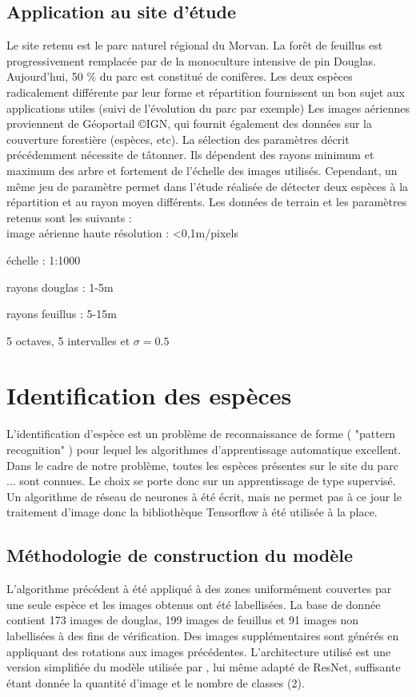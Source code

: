 \documentclass{article}
\begin{document}
	\subsection{Application au site d'étude}
	Le site retenu est le parc naturel régional du Morvan. La forêt de feuillus est progressivement remplacée par de la monoculture intensive de pin Douglas. Aujourd'hui, 50 \% du parc est constitué de conifères. Les deux espèces radicalement différente par leur forme et répartition fournissent un bon sujet aux applications utiles (suivi de l'évolution du parc par exemple) 
	Les images aériennes proviennent de Géoportail \copyright IGN, qui fournit également des données sur la couverture forestière (espèces, etc).
	La sélection des paramètres décrit précédemment nécessite de tâtonner. Ils dépendent des rayons minimum et maximum des arbre et fortement de l'échelle des images utilisés. Cependant, un même jeu de paramètre permet dans l'étude réalisée de détecter deux espèces à la répartition et au rayon moyen différents.  
	Les données de terrain et les paramètres retenus sont les suivants :\\
	
	image aérienne haute résolution : <0,1m/pixels

	échelle : 1:1000
	
	rayons douglas : 1-5m
	
	rayons feuillus : 5-15m

	5 octaves, 5 intervalles et $\sigma=0.5$
	
\section{Identification des espèces}

	L'identification d'espèce est un problème de reconnaissance de forme ( "pattern recognition" ) pour lequel les algorithmes d'apprentissage automatique excellent. 
	Dans le cadre de notre problème, toutes les espèces présentes sur le site du parc ... sont connues. Le choix se porte donc sur un apprentissage de type supervisé.
	Un algorithme de réseau de neurones à été écrit, mais ne permet pas à ce jour le traitement d'image donc la bibliothèque Tensorflow à été utilisée à la place.

	\subsection{Méthodologie de construction du modèle}

		L'algorithme précédent à été appliqué à des zones uniformément couvertes par une seule espèce et les images obtenus ont été labellisées. La base de donnée contient 173 images de douglas, 199 images de feuillus et 91 images non labellisées à des fins de vérification. Des images supplémentaires sont générés en appliquant des rotations aux images précédentes.
		L'architecture utilisé est une version simplifiée du modèle utilisée par , lui même adapté de ResNet, suffisante étant donnée la quantité d'image et le nombre de classes (2).
\end{document}
